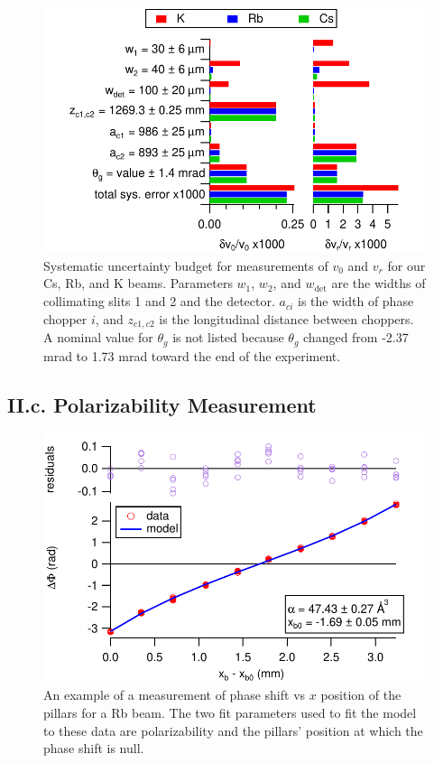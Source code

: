 \documentclass[twocolumn,prl,showpacs,superscriptaddress]{revtex4-1}   %
\begin{document}
\begin{figure}
\includegraphics[width=\linewidth,keepaspectratio]{displayVelErrors.pdf}
\caption{\label{velError}Systematic uncertainty budget for measurements of $v_0$ and $v_r$ for our Cs, Rb, and K beams. Parameters $w_1$, $w_2$, and $w_{\mathrm{det}}$ are the widths of collimating slits 1 and 2 and the detector. $a_{ci}$ is the width of phase chopper $i$, and $z_{c1,c2}$ is the longitudinal distance between choppers. A nominal value for $\theta_g$ is not listed because $\theta_g$ changed from -2.37 mrad to 1.73 mrad toward the end of the experiment.}
\end{figure}

\subsection{II.c. Polarizability Measurement}

\begin{figure}
\includegraphics[width=\linewidth,keepaspectratio]{dPvMP_150327_q.pdf}
\caption{\label{dPvMPExample}An example of a measurement of phase shift vs $x$ position of the pillars for a Rb beam. The two fit parameters used to fit the model to these data are polarizability and the pillars' position at which the phase shift is null.}
\end{figure}
\end{document}
